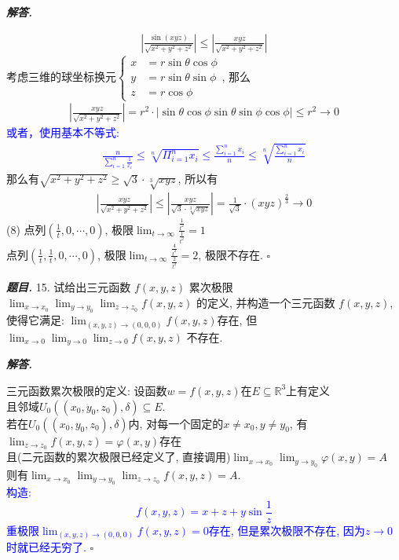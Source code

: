 \documentclass[10pt, a4paper, oneside]{ctexart}
\newenvironment{problem}{\begin{framed}\par\noindent\textbf{\textit{题目. }}}{\end{framed}\par}
\newenvironment{solution}{%
  \par\noindent\textbf{\textit{解答. }}\ignorespaces
}{%
  \hfill\ensuremath{\square}\par %
}
\begin{document}
\begin{solution}
\begin{align*}
    |\frac{\sin(xyz)}{\sqrt{x^2+y^2+z^2}}|\leq |\frac{xyz}{\sqrt{x^2+y^2+z^2}}|
\end{align*}
考虑三维的球坐标换元$\begin{cases}
    x&=r\sin \theta\cos \phi\\
    y&=r \sin \theta \sin \phi\\
    z&= r\cos \phi
\end{cases}$, 那么
\begin{align*}
    |\frac{xyz}{\sqrt{x^2+y^2+z^2}}|=r^2\cdot|\sin\theta\cos \phi \sin \theta \sin \phi\cos \phi|\leq r^2 \to 0
\end{align*}
\textcolor{blue}{或者，使用基本不等式:
\begin{align*}
\frac{n}{\sum_{i=1}^n \frac{1}{x_i}}\leq \sqrt[n]{\Pi_{i=1}^n x_i}\leq \frac{\sum_{i=1}^n x_i}{n} \leq \sqrt[n]{\frac{\sum_{i=1}^n x_i}{n}}
\end{align*} }
那么有$\sqrt{x^2+y^2+z^2}\geq \sqrt{3}\cdot \sqrt[3]{xyz}$, 所以有
\begin{align*}
    |\frac{xyz}{\sqrt{x^2+y^2+z^2}}|\leq |\frac{xyz}{\sqrt{3}\cdot \sqrt[3]{xyz}}|=\frac{1}{\sqrt{3}}\cdot (xyz)^{\frac{2}{3}}\to 0
\end{align*}
(8) 点列$(\frac{1}{t},0,\cdots,0)$, 极限$\lim_{t\to \infty}\frac{\frac{1}{t^2}}{\frac{1}{t^2}}=1$\\点列$(\frac{1}{t},\frac{1}{t}, 0,\cdots,0)$, 极限$\lim_{t\to \infty}\frac{\frac{4}{t^2}}{\frac{2}{t^2}}=2$, 极限不存在.
\end{solution}


\begin{problem}
15. 试给出三元函数 $f(x, y, z)$ 累次极限 $\lim _{x \rightarrow x_0} \lim _{y \rightarrow y_0} \lim _{z \rightarrow z_0} f(x, y, z)$ 的定义, 并构造一个三元函数 $f(x, y, z)$, 使得它满足: $\lim _{(x, y, z) \rightarrow(0,0,0)} f(x, y, z)$存在, 但 $\lim _{x \rightarrow 0} \lim _{y \rightarrow 0} \lim _{z \rightarrow 0} f(x, y, z)$ 不存在.
\end{problem}
\begin{solution}
三元函数累次极限的定义: 设函数$w = f(x,y,z)$在$E\subseteq \mathbb{R}^3$上有定义\\
且邻域$U_0( (x_0,y_0,z_0), \delta  )\subseteq E$.\\
若在$U_0( (x_0,y_0,z_0), \delta )$内, 对每一个固定的$x\neq x_0, y\neq y_0$, 有$\lim_{z\to z_0}f(x,y,z)= \varphi(x,y)$存在\\
且(二元函数的累次极限已经定义了, 直接调用)$\lim_{x\to x_0}\lim_{y\to y_0}\varphi(x,y)=A$\\
则有$\lim_{x\to x_0}\lim_{y\to y_0}\lim_{z\to z_0}f(x,y,z)=A$.\\
\textcolor{blue}{构造:
$$f(x,y,z)=x+z+y\sin \frac{1}{z}$$
重极限$\lim_{(x,y,z)\to (0,0,0) }f(x,y,z)=0$存在, 但是累次极限不存在, 因为$z\to 0 $时就已经无穷了.}
\end{solution}
\end{document}
